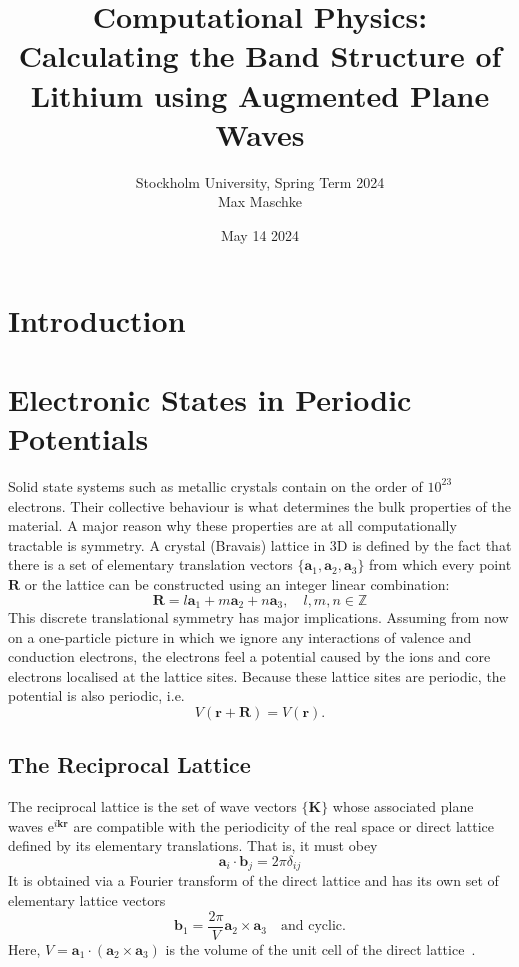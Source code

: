 \documentclass[a4paper,DIV=12,english]{scrartcl}
\title{Computational Physics: Calculating the Band Structure of Lithium using Augmented Plane Waves}
\author{Stockholm University, Spring Term 2024 \\Max Maschke}
\date{May 14 2024}
\begin{document}
\maketitle


\tableofcontents
\newpage


\newpage
\section{Introduction}\cite{github}

\section{Electronic States in Periodic Potentials}
Solid state systems such as metallic crystals contain on the order of $10^{23}$ electrons. Their collective behaviour is what determines the bulk properties of the material. A major reason why these properties are at all computationally tractable is symmetry. A crystal (Bravais) lattice in 3D is defined by the fact that there is a set of elementary translation vectors $\{\textbf{a}_1, \textbf{a}_2, \textbf{a}_3\}$ from which every point $\textbf{R}$ or the lattice can be constructed using an integer linear combination:
\begin{equation}
    \textbf{R} = l\textbf{a}_1 + m\textbf{a}_2 + n\textbf{a}_3, \quad l,m,n\in\mathbb{Z}
\end{equation}
This discrete translational symmetry has major implications. Assuming from now on a one-particle picture in which we ignore any interactions of valence and conduction electrons, the electrons feel a potential caused by the ions and core electrons localised at the lattice sites. Because these lattice sites are periodic, the potential is also periodic, i.e.
\begin{equation}
    V(\textbf{r} + \textbf{R}) = V(\textbf{r}).
\end{equation}

\subsection{The Reciprocal Lattice}
The reciprocal lattice is the set of wave vectors $\{\textbf{K}\}$ whose associated plane waves $\text{e}^{i\textbf{k}\textbf{r}}$ are compatible with the periodicity of the real space or direct lattice defined by its elementary translations. That is, it must obey
\begin{equation}
    \textbf{a}_i \cdot \textbf{b}_j = 2\pi \delta_{ij}
\end{equation}
It is obtained via a Fourier transform of the direct lattice and has its own set of elementary lattice vectors
\begin{equation}
    \textbf{b}_1 = \frac{2\pi}{V} \textbf{a}_2 \times \textbf{a}_3 \quad \text{and cyclic.}
\end{equation}
Here, $V=\textbf{a}_1 \cdot (\textbf{a}_2 \times \textbf{a}_3)$ is the volume of the unit cell of the direct lattice~\cite{theoFestkörper}.
\end{document}
